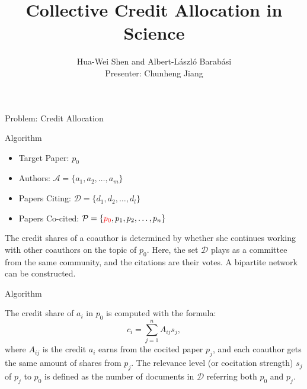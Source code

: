 \documentclass{beamer}
\title[]{Collective Credit Allocation in Science}
\author[Hua-Wei Shen and Albert-L\'aszl\'o Barab\'asi]{Hua-Wei Shen and Albert-L\'aszl\'o Barab\'asi\\Presenter: Chunheng Jiang}
\date{}
\begin{document}
\begin{frame}
\titlepage
\end{frame}

\begin{frame}{Problem: Credit Allocation}
\end{frame}

\begin{frame}{Algorithm}
\begin{block}{}
\begin{itemize}
\item Target Paper: $p_0$
\item Authors: $\mathcal A=\{a_1,a_2,\ldots,a_m\}$
\item Papers Citing: $\mathcal D=\{d_1,d_2,\ldots,d_l\}$
\item Papers Co-cited: $\mathcal P=\{\textcolor{red}{p_0},p_1,p_2,\ldots,p_n\}$
\end{itemize}

The credit shares of a coauthor is determined by whether she continues working with other coauthors on the topic of $p_0$. Here, the set $\mathcal D$ plays as a committee from the same community, and the citations are their votes. A bipartite network can be constructed. 
\end{block}
\end{frame}

\begin{frame}{Algorithm}
\begin{block}{}
The credit share of $a_i$ in $p_0$ is computed with the formula: 
\[c_i = \sum_{j=1}^n A_{ij}s_j,\]
where $A_{ij}$ is the credit $a_i$ earns from the cocited paper $p_j$, and each coauthor gets the same amount of shares from $p_j$. The relevance level (or cocitation strength) $s_j$ of $p_j$ to $p_0$ is defined as the number of documents in $\mathcal D$ referring both $p_0$ and $p_j$.
\end{block}
\end{frame}
\end{document}
